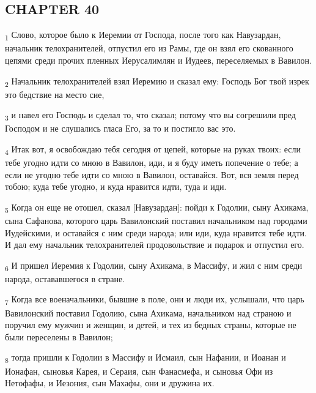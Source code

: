 \subsection{CHAPTER 40}
\begin{tcolorbox}
\textsubscript{1} Слово, которое было к Иеремии от Господа, после того как Навузардан, начальник телохранителей, отпустил его из Рамы, где он взял его скованного цепями среди прочих пленных Иерусалимлян и Иудеев, переселяемых в Вавилон.
\end{tcolorbox}
\begin{tcolorbox}
\textsubscript{2} Начальник телохранителей взял Иеремию и сказал ему: Господь Бог твой изрек это бедствие на место сие,
\end{tcolorbox}
\begin{tcolorbox}
\textsubscript{3} и навел его Господь и сделал то, что сказал; потому что вы согрешили пред Господом и не слушались гласа Его, за то и постигло вас это.
\end{tcolorbox}
\begin{tcolorbox}
\textsubscript{4} Итак вот, я освобождаю тебя сегодня от цепей, которые на руках твоих: если тебе угодно идти со мною в Вавилон, иди, и я буду иметь попечение о тебе; а если не угодно тебе идти со мною в Вавилон, оставайся. Вот, вся земля перед тобою; куда тебе угодно, и куда нравится идти, туда и иди.
\end{tcolorbox}
\begin{tcolorbox}
\textsubscript{5} Когда он еще не отошел, сказал [Навузардан]: пойди к Годолии, сыну Ахикама, сына Сафанова, которого царь Вавилонский поставил начальником над городами Иудейскими, и оставайся с ним среди народа; или иди, куда нравится тебе идти. И дал ему начальник телохранителей продовольствие и подарок и отпустил его.
\end{tcolorbox}
\begin{tcolorbox}
\textsubscript{6} И пришел Иеремия к Годолии, сыну Ахикама, в Массифу, и жил с ним среди народа, остававшегося в стране.
\end{tcolorbox}
\begin{tcolorbox}
\textsubscript{7} Когда все военачальники, бывшие в поле, они и люди их, услышали, что царь Вавилонский поставил Годолию, сына Ахикама, начальником над страною и поручил ему мужчин и женщин, и детей, и тех из бедных страны, которые не были переселены в Вавилон;
\end{tcolorbox}
\begin{tcolorbox}
\textsubscript{8} тогда пришли к Годолии в Массифу и Исмаил, сын Нафании, и Иоанан и Ионафан, сыновья Карея, и Сераия, сын Фанасмефа, и сыновья Офи из Нетофафы, и Иезония, сын Махафы, они и дружина их.
\end{tcolorbox}
